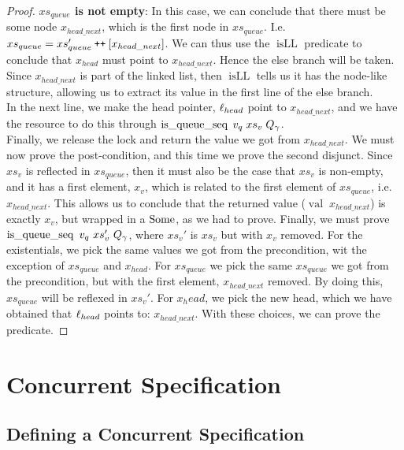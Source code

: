 \documentclass[a4paper, 11pt]{report}
\newcommand{\isqueueseq}{\operatorname{is\_queue\_seq}}
\newcommand{\isLL}{\operatorname{isLL}}
\newcommand{\nVal}[1]{\operatorname{val} \; #1}
\newcommand\catenate{\mathbin{\text{\ttfamily\upshape ++}}}
\begin{document}
\begin{proof}
\textbf{$xs_{queue}$ is not empty}: In this case, we can conclude that there must be some node $x_{head\_next}$, which is the first node in $xs_{queue}$. I.e. $xs_{queue} = xs'_{queue} \catenate [x_{head\_next}]$. We can thus use the $\isLL$ predicate to conclude that $x_{head}$ must point to $x_{head\_next}$. Hence the else branch will be taken. Since $x_{head\_next}$ is part of the linked list, then $\isLL$ tells us it has the node-like structure, allowing us to extract its value in the first line of the else branch.\\
In the next line, we make the head pointer, $\ell_{head}$ point to $x_{head\_next}$, and we have the resource to do this through $\isqueueseq \; v_q \; xs_v \; Q_\gname$.\\
Finally, we release the lock and return the value we got from $x_{head\_next}$. We must now prove the post-condition, and this time we prove the second disjunct. Since $xs_v$ is reflected in $xs_{queue}$, then it must also be the case that $xs_v$ is non-empty, and it has a first element, $x_v$, which is related to the first element of $xs_{queue}$, i.e. $x_{head\_next}$. This allows us to conclude that the returned value ($\nVal{x_{head\_next}}$) is exactly $x_v$, but wrapped in a $\operatorname{Some}$, as we had to prove.
Finally, we must prove $\isqueueseq\ v_q\ xs_v'\ Q_\gname$, where $xs_v'$ is $xs_v$ but with $x_v$ removed. For the existentials, we pick the same values we got from the precondition, wit the exception of $xs_{queue}$ and $x_{head}$. For $xs_{queue}$ we pick the same $xs_{queue}$ we got from the precondition, but with the first element, $x_{head\_next}$ removed. By doing this, $xs_{queue}$ will be reflexed in $xs_v'$. For $x_head$, we pick the new head, which we have obtained that $\ell_{head}$ points to: $x_{head\_next}$. With these choices, we can prove the predicate.
\end{proof}

\chapter{Concurrent Specification}
\label{ch:TLMSQCONC}

\section{Defining a Concurrent Specification}
\label{TLMSQCONC:section:concurrent-spec}
\end{document}
